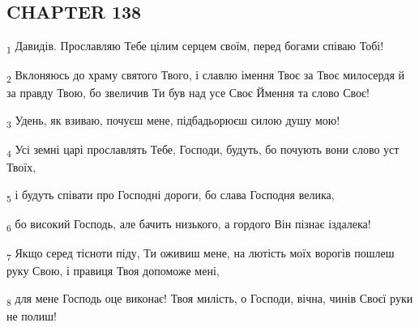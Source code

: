 \subsection{CHAPTER 138}
\begin{tcolorbox}
\textsubscript{1} Давидів. Прославляю Тебе цілим серцем своїм, перед богами співаю Тобі!
\end{tcolorbox}
\begin{tcolorbox}
\textsubscript{2} Вклоняюсь до храму святого Твого, і славлю імення Твоє за Твоє милосердя й за правду Твою, бо звеличив Ти був над усе Своє Ймення та слово Своє!
\end{tcolorbox}
\begin{tcolorbox}
\textsubscript{3} Удень, як взиваю, почуєш мене, підбадьорюєш силою душу мою!
\end{tcolorbox}
\begin{tcolorbox}
\textsubscript{4} Усі земні царі прославлять Тебе, Господи, будуть, бо почують вони слово уст Твоїх,
\end{tcolorbox}
\begin{tcolorbox}
\textsubscript{5} і будуть співати про Господні дороги, бо слава Господня велика,
\end{tcolorbox}
\begin{tcolorbox}
\textsubscript{6} бо високий Господь, але бачить низького, а гордого Він пізнає іздалека!
\end{tcolorbox}
\begin{tcolorbox}
\textsubscript{7} Якщо серед тісноти піду, Ти оживиш мене, на лютість моїх ворогів пошлеш руку Свою, і правиця Твоя допоможе мені,
\end{tcolorbox}
\begin{tcolorbox}
\textsubscript{8} для мене Господь оце виконає! Твоя милість, о Господи, вічна, чинів Своєї руки не полиш!
\end{tcolorbox}
